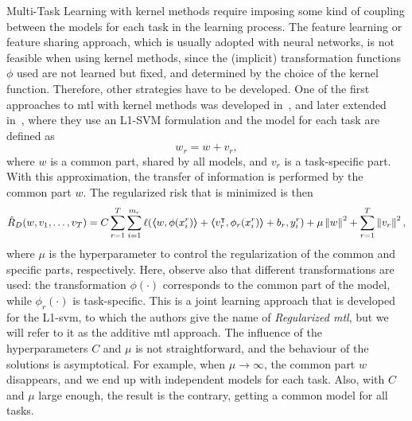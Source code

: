 Multi-Task Learning with kernel methods require imposing some kind of coupling between the models for each task in the learning process. The feature learning or feature sharing approach, which is usually adopted with neural networks, is not feasible when using kernel methods, since the (implicit) transformation functions $\phi$ used are not learned but fixed, and determined by the choice of the kernel function. Therefore, other strategies have to be developed. 
One of the first approaches to \acrshort{mtl} with kernel methods was developed in~\cite{EvgeniouP04}, and later extended in~\citet{CaiC09, CaiC12}, where they use an L1-SVM formulation and the model for each task are defined as
\begin{equation}
    \nonumber
    {w}_r = {w} + {v}_r,
\end{equation} 
where $w$ is a common part, shared by all models, and $v_r$ is a task-specific part. With this approximation, the transfer of information is performed by the common part ${w}$.
The regularized risk that is minimized is then
\begin{equation}
    \nonumber
    \hat{R}_{D} ({w, v_1, \ldots, v_T}) = C \sum_{r=1}^{T} \sum_{i=1}^{m_r} \ell(
        \bm{\left\langle} w, \phi({x}_i^r) \bm{\right\rangle} + \bm{\left\langle} {v}_r^\intercal, \phi_r({x}_i^r) \bm{\right\rangle} + b_r, y_i^r) + \mu \left\lVert{w}\right\rVert^2 + \sum_{r=1}^T \left\lVert{v}_r\right\rVert^2,
\end{equation}
where $\mu$ is the hyperparameter to control the regularization of the common and specific parts, respectively. 
Here, observe also that different transformations are used: the transformation $\phi(\cdot)$ corresponds to the common part of the model, while $\phi_r(\cdot)$ is task-specific.
%
This is a joint learning approach that is developed for the L1-\acrshort{svm}, to which the authors give the name of \emph{Regularized \acrshort{mtl}}, but we will refer to it as the {additive} \acrshort{mtl} approach.
The influence of the hyperparameters $C$ and $\mu$ is not straightforward, and the behaviour of the solutions is asymptotical. For example, when $\mu \to \infty$, the common part $w$ disappears, and we end up with independent models for each task. Also, with $C$ and $\mu$ large enough, the result is the contrary, getting a common model for all tasks.

